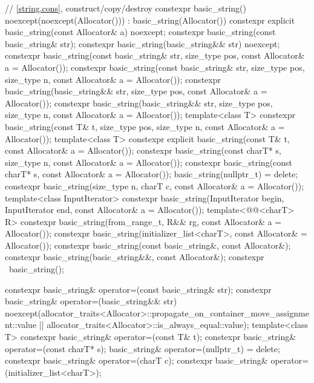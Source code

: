 \begin{codeblock}
{{    // \ref{string.cons}, construct/copy/destroy
    constexpr basic_string() noexcept(noexcept(Allocator())) : basic_string(Allocator()) { }
    constexpr explicit basic_string(const Allocator& a) noexcept;
    constexpr basic_string(const basic_string& str);
    constexpr basic_string(basic_string&& str) noexcept;
    constexpr basic_string(const basic_string& str, size_type pos,
                           const Allocator& a = Allocator());
    constexpr basic_string(const basic_string& str, size_type pos, size_type n,
                           const Allocator& a = Allocator());
    constexpr basic_string(basic_string&& str, size_type pos,
                           const Allocator& a = Allocator());
    constexpr basic_string(basic_string&& str, size_type pos, size_type n,
                           const Allocator& a = Allocator());
    template<class T>
      constexpr basic_string(const T& t, size_type pos, size_type n,
                             const Allocator& a = Allocator());
    template<class T>
      constexpr explicit basic_string(const T& t, const Allocator& a = Allocator());
    constexpr basic_string(const charT* s, size_type n, const Allocator& a = Allocator());
    constexpr basic_string(const charT* s, const Allocator& a = Allocator());
    basic_string(nullptr_t) = delete;
    constexpr basic_string(size_type n, charT c, const Allocator& a = Allocator());
    template<class InputIterator>
      constexpr basic_string(InputIterator begin, InputIterator end,
                             const Allocator& a = Allocator());
    template<@@<charT> R>
      constexpr basic_string(from_range_t, R&& rg, const Allocator& a = Allocator());
    constexpr basic_string(initializer_list<charT>, const Allocator& = Allocator());
    constexpr basic_string(const basic_string&, const Allocator&);
    constexpr basic_string(basic_string&&, const Allocator&);
    constexpr ~basic_string();

    constexpr basic_string& operator=(const basic_string& str);
    constexpr basic_string& operator=(basic_string&& str)
      noexcept(allocator_traits<Allocator>::propagate_on_container_move_assignment::value ||
               allocator_traits<Allocator>::is_always_equal::value);
    template<class T>
      constexpr basic_string& operator=(const T& t);
    constexpr basic_string& operator=(const charT* s);
    basic_string& operator=(nullptr_t) = delete;
    constexpr basic_string& operator=(charT c);
    constexpr basic_string& operator=(initializer_list<charT>);

}}
\end{codeblock}
